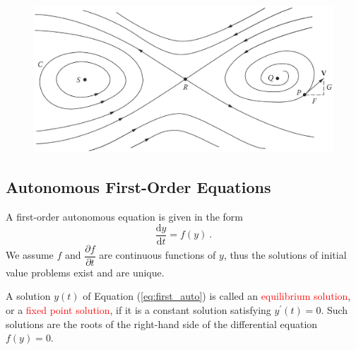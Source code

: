 \documentclass[12pt,a4paper]{article}
\newcommand{\dif}{\mathrm{d}}
\begin{document}
\begin{figure}
\centering
\includegraphics[height=6.cm, angle=0]{phase_plane.eps}
\caption{
}
\label{fig:phase_plane}
\end{figure}



\subsection{Autonomous First-Order Equations}
\cite{Herman:1742872} A first-order autonomous equation is given in the form
\begin{equation}
\dfrac{\dif y}{\dif t}  = f(y) ~.
\label{eq:first_auto}
\end{equation}
We assume $f$ and $\dfrac{\partial f}{\partial t}$ are continuous functions of $y$, thus the solutions of initial value problems exist and are unique.

A solution $y(t)$ of Equation (\ref{eq:first_auto}) is called an \textcolor{red}{equilibrium solution}, or a \textcolor{red}{fixed point solution}, if it is a constant solution satisfying $y^\prime(t) = 0$. Such solutions are the roots of the right-hand side of the differential equation $f(y) = 0$.
\end{document}
